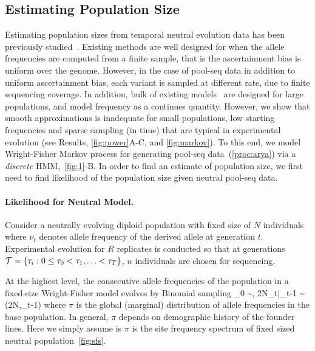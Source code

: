 \subsection{Estimating Population Size}
Estimating population sizes from temporal neutral evolution data has 
been previously studied~\cite{williamson1999using,anderson2000monte, 
bollback2008estimation, Terhorst2015Multi,jonas2016estimating}. Existing 
methods are well 
designed 
for when 
the allele 
frequencies are computed from a finite sample, that is the 
ascertainment bias 
is uniform over the genome. However, in the case of pool-seq data in 
addition 
to uniform ascertainment bias, 
each variant is sampled at different rate, due to finite sequencing 
coverage. In addition, bulk of existing 
models~\cite{bollback2008estimation,feder2014Identifying,topa2015gaussian,Terhorst2015Multi}
are designed for large populations, and model frequency as a 
continues quantity. However, we show that smooth approximations is 
inadequate for small populations, low
starting frequencies and sparse sampling (in time) that are typical in
experimental evolution (see Results, \ref{fig:power}A-C, and 
\ref{fig:markov}). To this end, we model Wright-Fisher Markov process for 
generating pool-seq data~(\ref{proc:arya}) via a \emph{discrete} 
HMM,~\ref{fig:1}-B. 
In order to find an estimate of population size, we first need to find 
likelihood of the population size given neutral pool-seq data.


\paragraph{Likelihood for Neutral Model.}
Consider a neutrally evolving diploid population with fixed size of  
$N$ 
individuals where 
$\nu_t$ denotes allele frequency of the derived allele at generation 
$t$.
Experimental evolution for $R$ replicates is conducted so that at 
generations 
 ${\cal T}= \{\tau_i: 0\le \tau_0<\tau_1,\ldots< \tau_T\}$, $n$ individuals 
 are chosen for sequencing. 
 

 At the highest level, the consecutive allele frequencies of the population in 
 a fixed-size Wright-Fisher model evolves by Binomial sampling
 \beq
 \nu_0 \sim \pi, \hspace{1in} 2N\nu_t|\nu_{t-1} \sim \bino(2N,\nu_{t-1})
 \eeq
where $\pi$ is the global (marginal) distribution of allele frequencies in the 
base 
population. In general, $\pi$ depends on demographic history of the founder 
lines. Here we simply assume is $\pi$ is the site frequency spectrum of fixed 
sized neutral population~\ref{fig:sfs}.

